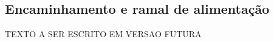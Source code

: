 \subsection{Encaminhamento e ramal de alimentação} \label{section: encaminhamento}
TEXTO A SER ESCRITO EM VERSAO FUTURA






